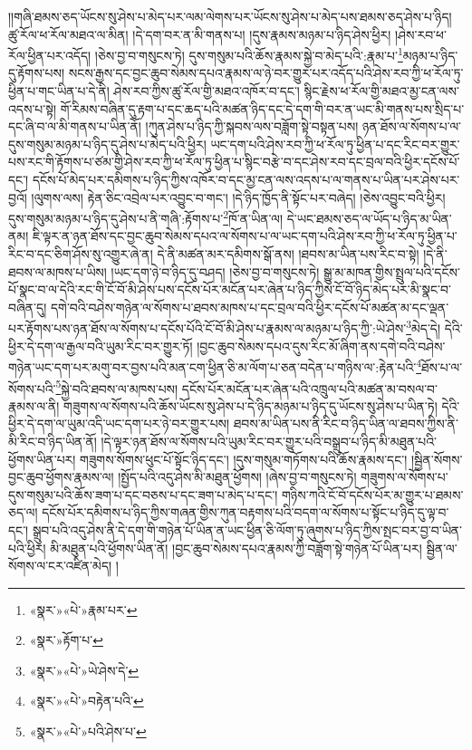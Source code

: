 །།གཞི་ཐམས་ཅད་ཡོངས་སུ་ཤེས་པ་མེད་པར་ལམ་ལེགས་པར་ཡོངས་སུ་ཤེས་པ་མེད་པས་ཐམས་ཅད་ཤེས་པ་ཉིད། ཚུ་རོལ་ཕ་རོལ་མཐའ་ལ་མིན། །དེ་དག་བར་ན་མི་གནས་པ། །དུས་རྣམས་མཉམ་པ་ཉིད་ཤེས་ཕྱིར། །ཤེས་རབ་ཕ་རོལ་ཕྱིན་པར་འདོད། །ཅེས་བྱ་བ་གསུངས་ཏེ། དུས་གསུམ་པའི་ཆོས་རྣམས་སྐྱེ་བ་མེད་པའི་:རྣམ་པ་\footnote{«སྣར་»«པེ་»རྣམ་པར་}མཉམ་པ་ཉིད་དུ་རྟོགས་པས། སངས་རྒྱས་དང་བྱང་ཆུབ་སེམས་དཔའ་རྣམས་ལ་ཉེ་བར་གྱུར་པར་འདོད་པའི་ཤེས་རབ་ཀྱི་ཕ་རོལ་ཏུ་ཕྱིན་པ་གང་ཡིན་པ་དེ་ནི། ཤེས་རབ་ཀྱིས་ཚུ་རོལ་གྱི་མཐའ་འཁོར་བ་དང་། སྙིང་རྗེས་ཕ་རོལ་གྱི་མཐའ་མྱ་ངན་ལས་འདས་པ་སྟེ། གོ་རིམས་བཞིན་དུ་རྟག་པ་དང་ཆད་པའི་མཚན་ཉིད་དང་དེ་དག་གི་བར་ན་ཡང་མི་གནས་པས་སྲིད་པ་དང་ཞི་བ་ལ་མི་གནས་པ་ཡིན་ནོ། །ཀུན་ཤེས་པ་ཉིད་ཀྱི་སྐབས་ལས་བཟློག་སྟེ་བསྟན་པས། ཉན་ཐོས་ལ་སོགས་པ་ལ་དུས་གསུམ་མཉམ་པ་ཉིད་དུ་ཤེས་པ་མེད་པའི་ཕྱིར། ཡང་དག་པའི་ཤེས་རབ་ཀྱི་ཕ་རོལ་ཏུ་ཕྱིན་པ་དང་རིང་བར་གྱུར་པས་རང་གི་རྟོགས་པ་ཙམ་གྱི་ཤེས་རབ་ཀྱི་ཕ་རོལ་ཏུ་ཕྱིན་པ་སྙིང་བརྩེ་བ་དང་ཤེས་རབ་དང་བྲལ་བའི་ཕྱིར་དངོས་པོ་དང་། དངོས་པོ་མེད་པར་དམིགས་པ་ཉིད་ཀྱིས་འཁོར་བ་དང་མྱ་ངན་ལས་འདས་པ་ལ་གནས་པ་ཡིན་པར་ཤེས་པར་བྱའོ། །ལུགས་ལས། རྟེན་ཅིང་འབྲེལ་པར་འབྱུང་བ་གང་། །དེ་ཉིད་ཁྱོད་ནི་སྟོང་པར་བཞེད། །ཅེས་འབྱུང་བའི་ཕྱིར། དུས་གསུམ་མཉམ་པ་ཉིད་དུ་ཤེས་པ་ནི་གཞི་:རྟོགས་པ་\footnote{«སྣར་»རྟོག་པ་}ཁོ་ན་ཡིན་ལ། དེ་ཡང་ཐམས་ཅད་ལ་ཡོད་པ་ཉིད་མ་ཡིན་ནམ། ཇི་ལྟར་ན་ཉན་ཐོས་དང་བྱང་ཆུབ་སེམས་དཔའ་ལ་སོགས་པ་ལ་ཡང་དག་པའི་ཤེས་རབ་ཀྱི་ཕ་རོལ་ཏུ་ཕྱིན་པ་རིང་བ་དང་ཅིག་ཤོས་སུ་འགྱུར་ཞེ་ན། དེ་ནི་མཚན་མར་དམིགས་སྒོ་ནས། །ཐབས་མ་ཡིན་པས་རིང་བ་སྟེ། །དེ་ནི་ཐབས་ལ་མཁས་པ་ཡིས། །ཡང་དག་ཉེ་བ་ཉིད་དུ་བཤད། །ཅེས་བྱ་བ་གསུངས་ཏེ། སྒྱུ་མ་མཁན་གྱིས་སྤྲུལ་པའི་དངོས་པོ་སྣང་བ་ལ་དེའི་རང་གི་ངོ་བོ་མི་ཤེས་པས་དངོས་པོར་མངོན་པར་ཞེན་པ་ཉིད་ཀྱིས་ངོ་བོ་ཉིད་མེད་པར་མི་སྣང་བ་བཞིན་དུ། དགེ་བའི་བཤེས་གཉེན་ལ་སོགས་པ་ཐབས་མཁས་པ་དང་བྲལ་བའི་ཕྱིར་དངོས་པོ་མཚན་མ་དང་ལྡན་པར་རྟོགས་པས་ཉན་ཐོས་ལ་སོགས་པ་དངོས་པོའི་ངོ་བོ་མི་ཤེས་པ་རྣམས་ལ་མཉམ་པ་ཉིད་ཀྱི་:ཡེ་ཤེས་\footnote{«སྣར་»«པེ་»ཡེ་ཤེས་དེ་}མེད་དེ། དེའི་ཕྱིར་དེ་དག་ལ་རྒྱལ་བའི་ཡུམ་རིང་བར་གྱུར་ཏོ། །བྱང་ཆུབ་སེམས་དཔའ་དུས་རིང་མོ་ཞིག་ནས་དགེ་བའི་བཤེས་གཉེན་ཡང་དག་པར་མགུ་བར་བྱས་པའི་མན་ངག་ཕྱིན་ཅི་མ་ལོག་པ་ཅན་བདེན་པ་གཉིས་ལ་:རྟེན་པའི་\footnote{«སྣར་»«པེ་»བརྟེན་པའི་}ཐོས་པ་ལ་སོགས་པའི་\footnote{«སྣར་»«པེ་»པའི་ཤེས་པ་}སྐྱེ་བའི་ཐབས་ལ་མཁས་པས། དངོས་པོར་མངོན་པར་ཞེན་པའི་འཁྲུལ་པའི་མཚན་མ་བསལ་བ་རྣམས་ལ་ནི། གཟུགས་ལ་སོགས་པའི་ཆོས་ཡོངས་སུ་ཤེས་པ་དེ་ཉིད་མཉམ་པ་ཉིད་དུ་ཡོངས་སུ་ཤེས་པ་ཡིན་ཏེ། དེའི་ཕྱིར་དེ་དག་ལ་ཡུམ་འདི་ཡང་དག་པར་ཉེ་བར་གྱུར་པས། ཐབས་མ་ཡིན་པས་ནི་རིང་བ་ཉིད་ཡིན་ལ་ཐབས་ཀྱིས་ནི་མི་རིང་བ་ཉིད་ཡིན་ནོ། །དེ་ལྟར་ཉན་ཐོས་ལ་སོགས་པའི་ཡུམ་རིང་བར་གྱུར་པའི་བསྒྲུབ་པ་ཉིད་མི་མཐུན་པའི་ཕྱོགས་ཡིན་པར། གཟུགས་སོགས་ཕུང་པོ་སྟོང་ཉིད་དང་། །དུས་གསུམ་གཏོགས་པའི་ཆོས་རྣམས་དང་། །སྦྱིན་སོགས་བྱང་ཆུབ་ཕྱོགས་རྣམས་ལ། །སྤྱོད་པའི་འདུ་ཤེས་མི་མཐུན་ཕྱོགས། །ཞེས་བྱ་བ་གསུངས་ཏེ། གཟུགས་ལ་སོགས་པ་དུས་གསུམ་པའི་ཆོས་ཟག་པ་དང་བཅས་པ་དང་ཟག་པ་མེད་པ་དང་། གཉིས་ཀའི་ངོ་བོ་དངོས་པོར་མ་གྱུར་པ་ཐམས་ཅད་ལ། དངོས་པོར་དམིགས་པ་ཉིད་ཀྱིས་གཞན་གྱིས་ཀུན་བརྟགས་པའི་བདག་ལ་སོགས་པ་སྟོང་པ་ཉིད་དུ་ལྟ་བ་དང་། སྒྲུབ་པའི་འདུ་ཤེས་ནི་དེ་དག་གི་གཉེན་པོ་ཡིན་ན་ཡང་ཕྱིན་ཅི་ལོག་ཏུ་ཞུགས་པ་ཉིད་ཀྱིས་སྤང་བར་བྱ་བ་ཡིན་པའི་ཕྱིར། མི་མཐུན་པའི་ཕྱོགས་ཡིན་ནོ། །བྱང་ཆུབ་སེམས་དཔའ་རྣམས་ཀྱི་བཟློག་སྟེ་གཉེན་པོ་ཡིན་པར། སྦྱིན་ལ་སོགས་ལ་ངར་འཛིན་མེད། །
